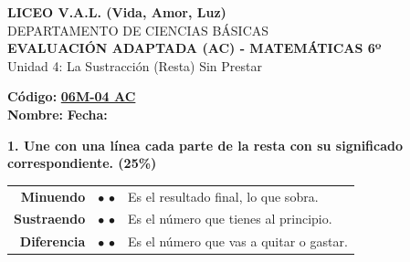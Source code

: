 \documentclass[12pt, letterpaper]{article}
\begin{document}
	
	\begin{center}
		{\Large \textbf{LICEO V.A.L. (Vida, Amor, Luz)}}\\[0.1cm]
		{\large DEPARTAMENTO DE CIENCIAS BÁSICAS}\\[0.1cm]
		\textbf{EVALUACIÓN ADAPTADA (AC) - MATEMÁTICAS 6º}\\[0.1cm]
		Unidad 4: La Sustracción (Resta) Sin Prestar
	\end{center}
	
	\vspace{0.3cm}
	
	\hfill \textbf{Código:} \textbf{\underline{06M-04 AC}}\\
	
	\noindent \textbf{Nombre:} \underline{\hspace{8cm}} \hspace{1cm}\textbf{Fecha:} \underline{\hspace{3cm}}
	
	\vspace{0.6cm}
	
	\noindent \textbf{1. Une con una línea cada parte de la resta con su significado correspondiente. (25\%)}
	
	\vspace{0.4cm}
	\begin{center}
		\renewcommand{\arraystretch}{1.8}
		\begin{tabular}{r c l}
			\textbf{\large Minuendo} & \hspace{1cm} $\bullet$ \hspace{2cm} $\bullet$ \hspace{1cm} & \large Es el resultado final, lo que sobra. \\[0.2cm]
			\textbf{\large Sustraendo}   & \hspace{1cm} $\bullet$ \hspace{2cm} $\bullet$ \hspace{1cm} & \large Es el número que tienes al principio. \\[0.2cm]
			\textbf{\large Diferencia}    & \hspace{1cm} $\bullet$ \hspace{2cm} $\bullet$ \hspace{1cm} & \large Es el número que vas a quitar o gastar.
		\end{tabular}
	\end{center}
	
	
	\vspace{0.6cm}
	
\end{document}
